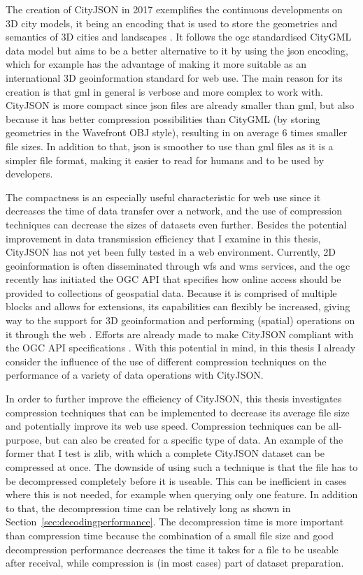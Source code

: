 The creation of CityJSON in 2017 exemplifies the continuous developments on 3D city models, it being an encoding that is used to store the geometries and semantics of 3D cities and landscapes \citep{ledoux2019cityjson}.
It follows the \ac{ogc} standardised CityGML data model but aims to be a better alternative to it by using the \ac{json} encoding, which for example has the advantage of making it more suitable as an international 3D geoinformation standard for web use.
The main reason for its creation is that \ac{gml} in general is verbose and more complex to work with.
CityJSON is more compact since \ac{json} files are already smaller than \ac{gml}, but also because it has better compression possibilities than CityGML (by storing geometries in the Wavefront OBJ \citep{Reddy} style), resulting in on average 6 times smaller file sizes.
In addition to that, \ac{json} is smoother to use than \ac{gml} files as it is a simpler file format, making it easier to read for humans and to be used by developers.


The compactness is an especially useful characteristic for web use since it decreases the time of data transfer over a network, and the use of compression techniques can decrease the sizes of datasets even further.
Besides the potential improvement in data transmission efficiency that I examine in this thesis, CityJSON has not yet been fully tested in a web environment.
Currently, 2D geoinformation is often disseminated through \ac{wfs} and \ac{wms} services, and the \ac{ogc} recently has initiated the OGC API \citep{ogcapi} that specifies how online access should be provided to collections of geospatial data.
Because it is comprised of multiple blocks and allows for extensions, its capabilities can flexibly be increased, giving way to the support for 3D geoinformation and performing (spatial) operations on it through the web \citep{ogcapi}.
Efforts are already made to make CityJSON compliant with the OGC API specifications \citep{Ledoux2020}.
With this potential in mind, in this thesis I already consider the influence of the use of different compression techniques on the performance of a variety of data operations with CityJSON.


In order to further improve the efficiency of CityJSON, this thesis investigates compression techniques that can be implemented to decrease its average file size and potentially improve its web use speed.
Compression techniques can be all-purpose, but can also be created for a specific type of data.
An example of the former that I test is zlib, with which a complete CityJSON dataset can be compressed at once.
The downside of using such a technique is that the file has to be decompressed completely before it is useable.
This can be inefficient in cases where this is not needed, for example when querying only one feature.
In addition to that, the decompression time can be relatively long as shown in Section~\ref{sec:decodingperformance}.
The decompression time is more important than compression time because the combination of a small file size and good decompression performance decreases the time it takes for a file to be useable after receival, while compression is (in most cases) part of dataset preparation.

